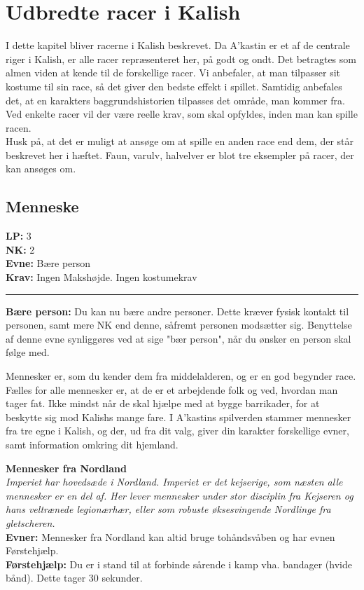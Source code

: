 \chapter{Udbredte racer i Kalish}
I dette kapitel bliver racerne i Kalish beskrevet. Da A’kastin er et af de centrale riger i Kalish, er alle racer repræsenteret her, på godt og ondt. Det betragtes som almen viden at kende til de forskellige racer. Vi anbefaler, at man tilpasser sit kostume til sin race, så det giver den bedste effekt i spillet. Samtidig anbefales det, at en karakters baggrundshistorien tilpasses det område, man kommer fra. Ved enkelte racer vil der være reelle krav, som skal opfyldes, inden man kan spille racen.\\
Husk på, at det er muligt at ansøge om at spille en anden race end dem, der står beskrevet her i hæftet. Faun, varulv, halvelver er blot tre eksempler på racer, der kan ansøges om.\\

\section{Menneske}
\begin{race*}[Mennesker]
\textbf{LP:} 3\\ 
\textbf{NK:} 2\\ 
\textbf{Evne:} Bære person\\
\textbf{Krav:} Ingen Makshøjde. Ingen kostumekrav\\
\rule{\textwidth}{0.4pt}
\textbf{Bære person:} Du kan nu bære andre personer. Dette kræver fysisk kontakt til personen, samt mere NK end denne, såfremt personen modsætter sig. Benyttelse af denne evne synliggøres ved at sige "bær person", når du ønsker en person skal følge med.\\
\end{race*}

Mennesker er, som du kender dem fra middelalderen, og er en god begynder race.\\
Fælles for alle mennesker er, at de er et arbejdende folk og ved, hvordan man tager fat. Ikke mindst når de skal hjælpe med at bygge barrikader, for at beskytte sig mod Kalishs mange fare. I A’kastins spilverden stammer mennesker fra tre egne i Kalish, og der, ud fra dit valg, giver din karakter forskellige evner, samt information omkring dit hjemland. 

\textbf{Mennesker fra Nordland}\\
\textit{Imperiet har hovedsæde i Nordland. Imperiet er det kejserige, som næsten alle mennesker er en del af. Her lever mennesker under stor disciplin fra Kejseren og hans veltrænede legionærhær, eller som robuste øksesvingende Nordlinge fra gletscheren.}\\
\textbf{Evner:} Mennesker fra Nordland kan altid bruge tohåndsvåben og har evnen Førstehjælp.\\
\textbf{Førstehjælp:} Du er i stand til at forbinde sårende i kamp vha. bandager (hvide bånd). Dette tager 30 sekunder.\\

